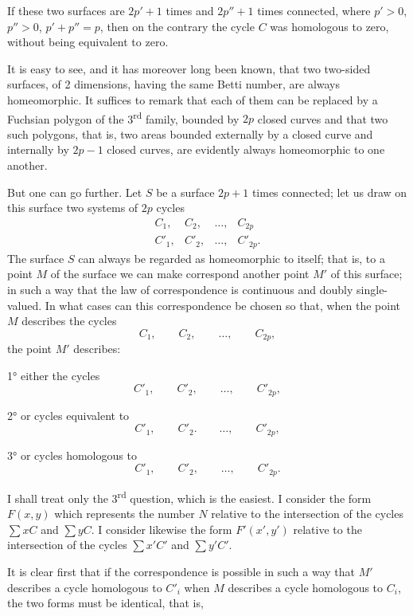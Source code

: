 \documentclass{article}
\begin{document}
If these two surfaces are $2p' + 1$ times and $2p'' + 1$ times connected, where $p' > 0$, $p'' > 0$, $p' + p'' = p$, then on the contrary the cycle $C$ was homologous to zero, without being equivalent to zero.

It is easy to see, and it has moreover long been known, that two two-sided surfaces, of 2 dimensions, having the same Betti number, are always homeomorphic. It suffices to remark that each of them can be replaced by a Fuchsian polygon of the 3\textsuperscript{rd} family, bounded by $2p$ closed curves and that two such polygons, that is, two areas bounded externally by a closed curve and internally by $2p - 1$ closed curves, are evidently always homeomorphic to one another.

But one can go further. Let $S$ be a surface $2p + 1$ times connected; let us draw on this surface two systems of $2p$ cycles
\[ \begin{matrix} C_{1}, & C_{2}, & \ldots, & C_{2p} \\[1ex] C'_{1}, & C'_{2}, & \ldots, & C'_{2p}. \end{matrix} \]
The surface $S$ can always be regarded as homeomorphic to itself; that is, to a point $M$ of the surface we can make correspond another point $M'$ of this surface; in such a way that the law of correspondence is continuous and doubly single-valued. In what cases can this correspondence be chosen so that, when the point $M$ describes the cycles
\[ C_{1}, \qquad C_{2}, \qquad \ldots, \qquad C_{2p}, \]
the point $M'$ describes:

1° either the cycles
\[ C'_{1}, \qquad C'_{2}, \qquad \ldots, \qquad C'_{2p}, \]

2° or cycles equivalent to
\[ C'_{1}, \qquad C'_{2}. \qquad \ldots, \qquad C'_{2p}, \]

3° or cycles homologous to
\[ C'_{1}, \qquad C'_{2}, \qquad \ldots, \qquad C'_{2p}. \]

I shall treat only the 3\textsuperscript{rd} question, which is the easiest. I consider the form $F(x, y)$ which represents the number $N$ relative to the intersection of the cycles $\displaystyle\sum x C$ and $\displaystyle\sum y C$. I consider likewise the form $F'(x', y')$ relative to the intersection of the cycles $\displaystyle\sum x' C'$ and $\displaystyle\sum y' C'$.

It is clear first that if the correspondence is possible in such a way that $M'$ describes a cycle homologous to $C'_{i}$ when $M$ describes a cycle homologous to $C_{i}$, the two forms must be identical, that is,
\end{document}
